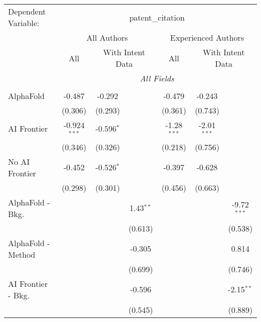 \begingroup
\centering
\begin{tabular}{lcccccc}
   \tabularnewline \midrule \midrule
   Dependent Variable: & \multicolumn{6}{c}{patent\_citation}\\
 & \multicolumn{3}{c}{All Authors} & \multicolumn{3}{c}{Experienced Authors} \\
\cmidrule(lr){2-4} \cmidrule(lr){5-7}
 & \multicolumn{1}{c}{All} & \multicolumn{2}{c}{With Intent Data} & \multicolumn{1}{c}{All} & \multicolumn{2}{c}{With Intent Data} \\
\cmidrule(lr){2-2} \cmidrule(lr){3-4} \cmidrule(lr){5-5} \cmidrule(lr){6-7}
 & \multicolumn{6}{c}{\textit{All Fields}} \\ \\
   AlphaFold               & -0.487         & -0.292       &               & -0.479        & -0.243        &   \\   
                           & (0.306)        & (0.293)      &               & (0.361)       & (0.743)       &   \\   
   AI Frontier             & -0.924$^{***}$ & -0.596$^{*}$ &               & -1.28$^{***}$ & -2.01$^{***}$ &   \\   
                           & (0.346)        & (0.326)      &               & (0.218)       & (0.756)       &   \\   
   No AI Frontier          & -0.452         & -0.526$^{*}$ &               & -0.397        & -0.628        &   \\   
                           & (0.298)        & (0.301)      &               & (0.456)       & (0.663)       &   \\   
   AlphaFold - Bkg.        &                &              & 1.43$^{**}$   &               &               & -9.72$^{***}$\\   
                           &                &              & (0.613)       &               &               & (0.538)\\   
   AlphaFold - Method      &                &              & -0.305        &               &               & 0.814\\   
                           &                &              & (0.699)       &               &               & (0.746)\\   
   AI Frontier - Bkg.      &                &              & -0.596        &               &               & -2.15$^{**}$\\   
                           &                &              & (0.545)       &               &               & (0.889)\\   

\end{tabular}
